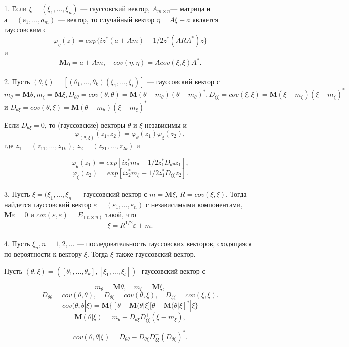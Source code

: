 1. Если $\xi=(\xi_1, \ldots, \xi_n)$ — гауссовский вектор, $A_{m\times n}$— матрица и $а = (а_1, \ldots,a_m)$ — вектор, то случайный вектор $\eta=A\xi+a$ является гауссовским с
$$\varphi_\eta(z)=exp\{iz^*(a+Am)-1/2z^*(ARA^*)z\}$$
и
$$\mathbf{M}\eta=a+Am, \quad cov(\eta,\eta)=Acov(\xi,\xi)A^*.$$\\


2. Пусть $(\theta,\xi)=[(\theta_1,\ldots,\theta_k)(\xi_1,\ldots,\xi_l)]$ — гауссовский вектор с
$m_\theta=\mathbf{M}\theta, m_\xi=\mathbf{M}\xi, D_{\theta\theta}=cov(\theta,\theta)=\mathbf{M}(\theta-m_\theta)(\theta-m_\theta)^*, D_{\xi\xi}=cov(\xi,\xi)=\mathbf{M}(\xi-m_\xi)(\xi-m_\xi)^*$ и $D_{\theta\xi}=cov(\theta,\xi)=\mathbf{M}(\theta-m_\theta)(\xi-m_\xi)^*$


Если $D_{\theta\xi}=0$, то (гауссовские) векторы $\theta$ и $\xi$ независимы и
$$\varphi_{(\theta,\xi)}(z_1,z_2)=\varphi_\theta(z_1)\varphi_\xi(z_2),$$
где $z_1=(z_{11},\ldots, z_{1k})$, $z_2=(z_{21},\ldots, z_{2k})$ и

$$\varphi_\theta(z_1)=exp[iz_1^*m_\theta-1/2z_1^*D_{\theta\theta}z_1],$$
$$\varphi_\xi(z_2)=exp[iz_2^*m_\xi-1/2z_1^*D_{\xi\xi}z_2].$$\\

3. Пусть $\xi=(\xi_1,\ldots,\xi_n$ — гауссовский вектор с $m=\mathbf{M}\xi$,
$R=cov(\xi,\xi)$. Тогда найдется гауссовский вектор $\varepsilon=(\varepsilon_1,\ldots,\varepsilon_n)$
с независимыми компонентами, $\mathbf{M}\varepsilon=0$ и $cov(\varepsilon,\varepsilon)=E_{(n\times n)}$
такой, что
$$\xi=R^{1/2}\varepsilon+m.$$\\


4. Пусть $\xi_n, n=1,2,\ldots$ — последовательность гауссовских
векторов, сходящаяся по вероятности к вектору $\xi$. Тогда $\xi$ также гауссовский вектор.\\


\begin{theorem} Пусть $(\theta, \xi) = ([\theta_1, \ldots, \theta_k], [\xi_1, \ldots, \xi_l])$- гауссовский вектор с

$$m_{\theta}=\mathbf{M}\theta, \quad m_{\xi}=\mathbf{M}\xi,$$
$$D_{\theta\theta}=cov(\theta, \theta), \quad D_{\theta\xi}=cov(\theta, \xi), \quad D_{\xi\xi}=cov(\xi, \xi).$$
$$cov(\theta,\theta|\xi) = \mathbf{M} \{[\theta - \mathbf{M}(\theta|\xi][\theta - \mathbf{M}(\theta|\xi]^*|\xi\}$$
\begin{equation}\label{reliable_princess_eq_1}
\mathbf{M}(\theta|\xi) = m_{\theta} + 
D_{\theta\xi}D_{\xi\xi}^{+}(\xi-m_{\xi}),
\end{equation}

\begin{equation}\label{reliable_princess_eq_2}
	cov(\theta,\theta|\xi) = D_{\theta\theta} - D_{\theta\xi}D_{\xi\xi}^{+}(D_{\theta\xi})^*.
\end{equation}

\end{theorem}


